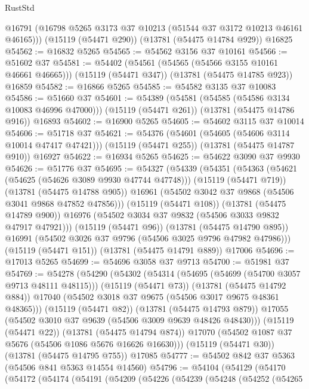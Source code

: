 \begin{lexlean}{RustStd}
\begin{coremodule}
      @16791
      (@16798 @5265 @3173 @37 @10213 (@51544 @37 @3172 @10213 @46161 @46165)))
    (@15119 (@54471 @290))
    (@13781 (@54475 @14784 @929))
    @16825
@54562 := @16832 @5265
@54565 := @54562 @3156 @37 @10161
@54566 := @51602 @37
@54581 := @54402
    (@54561 (@54565 (@54566 @3155 @10161 @46661 @46665)))
    (@15119 (@54471 @347))
    (@13781 (@54475 @14785 @923))
    @16859
@54582 := @16866 @5265
@54585 := @54582 @3135 @37 @10083
@54586 := @51660 @37
@54601 := @54389
    (@54581 (@54585 (@54586 @3134 @10083 @46996 @47000)))
    (@15119 (@54471 @261))
    (@13781 (@54475 @14786 @916))
    @16893
@54602 := @16900 @5265
@54605 := @54602 @3115 @37 @10014
@54606 := @51718 @37
@54621 := @54376
    (@54601 (@54605 (@54606 @3114 @10014 @47417 @47421)))
    (@15119 (@54471 @255))
    (@13781 (@54475 @14787 @910))
    @16927
@54622 := @16934 @5265
@54625 := @54622 @3090 @37 @9930
@54626 := @51776 @37
@54695 := @54327
    (@54339
      (@54351
        (@54363
          (@54621 (@54625 (@54626 @3089 @9930 @47744 @47748)))
          (@15119 (@54471 @719))
          (@13781 (@54475 @14788 @905))
          @16961
          (@54502 @3042 @37 @9868 (@54506 @3041 @9868 @47852 @47856)))
        (@15119 (@54471 @108))
        (@13781 (@54475 @14789 @900))
        @16976
        (@54502 @3034 @37 @9832 (@54506 @3033 @9832 @47917 @47921)))
      (@15119 (@54471 @96))
      (@13781 (@54475 @14790 @895))
      @16991
      (@54502 @3026 @37 @9796 (@54506 @3025 @9796 @47982 @47986)))
    (@15119 (@54471 @151))
    (@13781 (@54475 @14791 @889))
    @17006
@54696 := @17013 @5265
@54699 := @54696 @3058 @37 @9713
@54700 := @51981 @37
@54769 := @54278
    (@54290
      (@54302
        (@54314
          (@54695 (@54699 (@54700 @3057 @9713 @48111 @48115)))
          (@15119 (@54471 @73))
          (@13781 (@54475 @14792 @884))
          @17040
          (@54502 @3018 @37 @9675 (@54506 @3017 @9675 @48361 @48365)))
        (@15119 (@54471 @82))
        (@13781 (@54475 @14793 @879))
        @17055
        (@54502 @3010 @37 @9639 (@54506 @3009 @9639 @48426 @48430)))
      (@15119 (@54471 @22))
      (@13781 (@54475 @14794 @874))
      @17070
      (@54502 @1087 @37 @5676 (@54506 @1086 @5676 @16626 @16630)))
    (@15119 (@54471 @30))
    (@13781 (@54475 @14795 @755))
    @17085
@54777 := @54502 @842 @37 @5363 (@54506 @841 @5363 @14554 @14560)
@54796 := @54104
    (@54129
      (@54170
        (@54172
          (@54174
            (@54191
              (@54209
                (@54226
                  (@54239
                    (@54248
                      (@54252
                        (@54265

\end{coremodule}
\end{lexlean}
